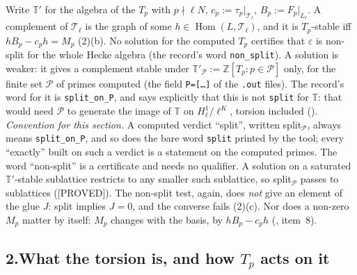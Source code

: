 \documentclass[11pt]{article}
\newcommand{\Z}{\mathbb{Z}}
\newcommand{\code}[1]{\texttt{#1}}
\newcommand{\file}[1]{\texttt{#1}}
\newcommand{\PROVED}{\textsf{\small[PROVED]}}
\newcommand{\Hom}{\operatorname{Hom}}
\begin{document}
Write $\mathbb T'$ for the algebra of the $T_p$ with $p\nmid\ell N$, $c_p:=\tau_p|_{\mathcal T_\ell}$, $B_p:=F_p|_{L_\ell}$. A complement of $\mathcal T_\ell$ is the graph of some $h\in\Hom(L,\mathcal T_\ell)$, and it is $T_p$-stable iff $hB_p-c_ph=M_p$ {}(2)(b). No solution for the computed $T_p$ certifies that $\varepsilon$ is non-split for the whole Hecke algebra (the record's word \code{non\_split}). A solution is weaker: it gives a complement stable under $\mathbb T'_{\mathcal P}:=\Z[T_p: p\in\mathcal P]$ only, for the finite set $\mathcal P$ of primes computed (the field \code{P=[\dots]} of the \file{.out} files). The record's word for it is \code{split\_on\_P}, and {} says explicitly that this is not \code{split} for $\mathbb T$: that would need $\mathcal P$ to generate the image of $\mathbb T$ on $H^{1}_\ell/\ell^{K}$, torsion included ({}). \emph{Convention for this section.} A computed verdict ``split'', written split$_{\mathcal P}$, always means \code{split\_on\_P}, and so does the bare word \code{split} printed by the tool; every ``exactly'' built on such a verdict is a statement on the computed primes. The word ``non-split'' is a certificate and needs no qualifier. A solution on a saturated $\mathbb T'$-stable sublattice restricts to any smaller such sublattice, so split$_{\mathcal P}$ passes to sublattices (\PROVED). The non-split test, again, does \emph{not} give an element of the glue $J$: split implies $J=0$, and the converse fails (2)(c). Nor does a non-zero $M_p$ matter by itself: $M_p$ changes with the basis, by $hB_p-c_ph$ ({}, item~8).

\subsection*{2.\quad What the torsion is, and how $T_p$ acts on it}
\end{document}
